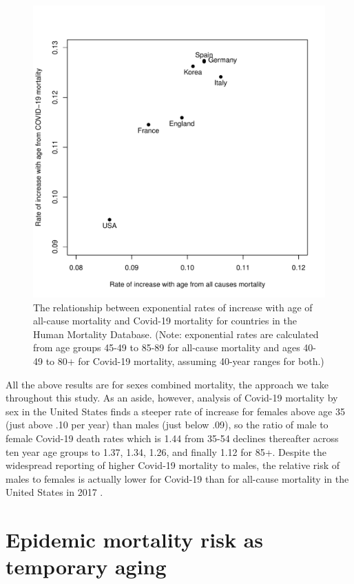 \documentclass[9pt,twocolumn,twoside,lineno]{pnas-new}
\begin{document}
\begin{figure}[h]%
\centering
\includegraphics[width=.8\linewidth]{fig2_gompertz_scatter}
\caption{The relationship between exponential rates of increase with age of
  all-cause mortality and Covid-19 mortality for countries in the
  Human Mortality Database. (Note: exponential rates are calculated
  from age groups 45-49 to 85-89 for all-cause mortality and ages
  40-49 to 80$+$ for Covid-19 mortality, assuming 40-year ranges for
  both.)}
\label{fig:gompertz}
\end{figure}



All the above results are for sexes combined mortality, the approach
we take throughout this study. As an aside, however, analysis of
Covid-19 mortality by sex in the United States finds a steeper rate of
increase for females above age 35 (just above .10 per year) than males
(just below .09), so the ratio of male to female Covid-19 death rates
which is 1.44 from 35-54 declines thereafter across ten year age
groups to 1.37, 1.34, 1.26, and finally 1.12 for 85+. Despite the
widespread reporting of higher Covid-19 mortality to males, the
relative risk of males to females is actually lower for Covid-19 than
for all-cause mortality in the United States in 2017 \cite{HMD}.  

\section*{Epidemic mortality risk as temporary aging}
\end{document}
